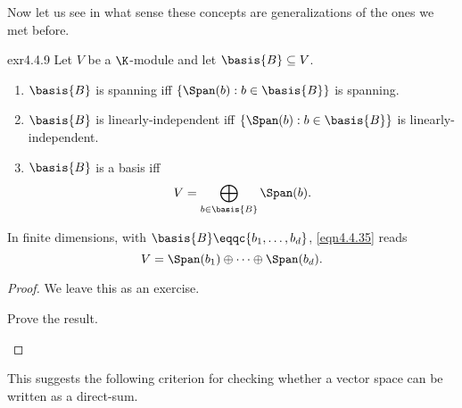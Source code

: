 Now let us see in what sense these concepts are generalizations of the ones we met before.
\begin{prp}{}{exr4.4.9}
	Let $V$ be a $\K$-module and let $\basis{B}\subseteq V$.
	\begin{enumerate}
		\item $\basis{B}$ is spanning iff $\{ \Span (b):b\in \basis{B}\}$ is spanning.
		\item $\basis{B}$ is linearly-independent iff $\{ \Span (b):b\in \basis{B}\}$ is linearly-independent.
		\item $\basis{B}$ is a basis iff
		\begin{equation}\label{eqn4.4.35}
			V=\bigoplus _{b\in \basis{B}}\Span (b).
		\end{equation}
	\end{enumerate}
	\begin{rmk}
		In finite dimensions, with $\basis{B}\eqqc \{ b_1,\ldots ,b_d\}$, \eqref{eqn4.4.35} reads
		\begin{equation}\label{eqn4.4.23}
			V=\Span (b_1)\oplus \cdots \oplus \Span (b_d).
		\end{equation}
	\end{rmk}
	\begin{proof}
		We leave this as an exercise.
		\begin{exr}[breakable=false]{}{}
			Prove the result.
		\end{exr}
	\end{proof}
\end{prp}
This suggests the following criterion for checking whether a vector space can be written as a direct-sum.

